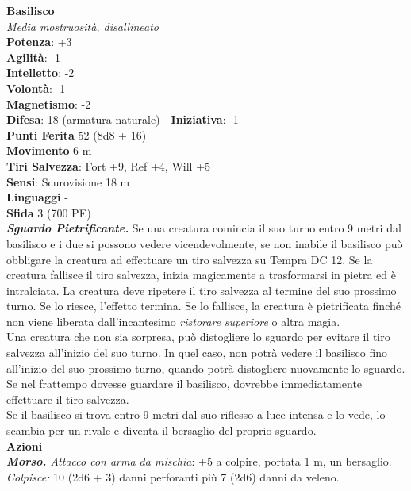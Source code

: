 \begin{multicols}{2}
\medskip\textbf{Basilisco}\\
\emph{Media mostruosità, disallineato}\\
\textbf{Potenza}: +3\\
\textbf{Agilità}: -1\\
\textbf{Intelletto}: -2\\
\textbf{Volontà}: -1\\
\textbf{Magnetismo}: -2\\
\textbf{Difesa}: 18 (armatura naturale) - \textbf{Iniziativa}: -1\\
\textbf{Punti Ferita} 52 (8d8 + 16)\\
\textbf{Movimento} 6 m\\
\textbf{Tiri Salvezza}: Fort +9, Ref +4, Will +5\\
\textbf{Sensi}: Scurovisione 18 m\\
\textbf{Linguaggi} -\\
\textbf{Sfida} 3 (700 PE)\smallskip\\
\emph{\textbf{Sguardo Pietrificante.}} Se una creatura comincia il suo turno entro 9 metri dal basilisco e i due si possono vedere vicendevolmente, se non inabile il basilisco può obbligare la creatura ad effettuare un tiro salvezza su Tempra DC 12. Se la creatura fallisce il tiro  salvezza, inizia magicamente a trasformarsi in pietra ed è   intralciata. La creatura deve ripetere il tiro salvezza al termine del   suo prossimo turno. Se lo riesce, l'effetto termina. Se lo fallisce,   la creatura è pietrificata finché non viene liberata dall'incantesimo  \emph{ristorare} \emph{superiore} o altra magia. \\
Una creatura che non sia sorpresa, può distogliere lo sguardo per evitare il tiro salvezza all'inizio del suo turno. In quel caso, non potrà vedere il basilisco fino all'inizio del suo prossimo turno, quando potrà distogliere nuovamente lo sguardo. Se nel frattempo dovesse guardare il basilisco, dovrebbe immediatamente effettuare il tiro salvezza.\\
Se il basilisco si trova entro 9 metri dal suo riflesso a luce intensa e lo vede, lo scambia per un rivale e diventa il bersaglio del proprio sguardo.\\
\smallskip\textbf{Azioni}\\
\emph{\textbf{Morso.} Attacco con arma da mischia}: +5 a colpire, portata 1 m, un bersaglio. \\
\emph{Colpisce:} 10 (2d6 + 3) danni perforanti più 7 (2d6) danni da veleno.\\

\end{multicols}
